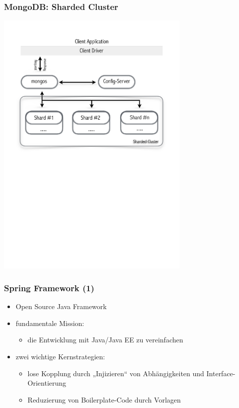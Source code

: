\documentclass{beamer} %
\begin{document}
\begin{frame}
\frametitle{MongoDB: Sharded Cluster}
\begin{center}
\includegraphics[trim = 0mm 139mm 0mm 22mm, clip, width=0.7\textwidth]{img/shardedCluster}
\end{center}
\end{frame}

\begin{frame}
\frametitle{Spring Framework (1)}
\begin{itemize}
\item Open Source Java Framework\newline
\item fundamentale Mission:
\begin{itemize}
\item die Entwicklung mit Java/Java EE zu vereinfachen\newline
\end{itemize}
\item zwei wichtige Kernstrategien:
\begin{itemize}
\item lose Kopplung durch „Injizieren“ von Abhängigkeiten und Interface-Orientierung

\item Reduzierung von Boilerplate-Code durch Vorlagen
\end{itemize}
\end{itemize}
\end{frame}
\end{document}
